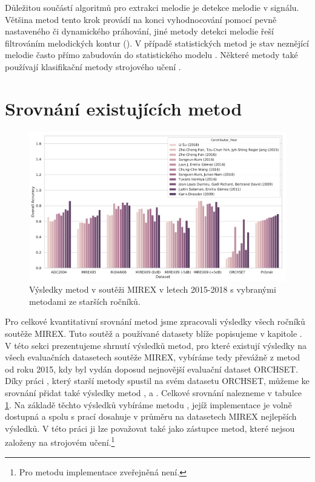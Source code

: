 Důležitou součástí algoritmů pro extrakci melodie je detekce melodie v signálu. Většina metod tento krok provádí na konci vyhodnocování pomocí pevně nastaveného či dynamického práhování, jiné metody detekci melodie řeší filtrováním melodických kontur (\cite{Salamon2012a}). V případě statistických metod je stav neznějící melodie často přímo zabudován do statistického modelu \citep{Ryynanen2008}. Některé metody také používají klasifikační metody strojového učení \citep{Rigaud2016}.

\section{Srovnání existujících metod}

\begin{figure}[h]\centering
\includegraphics[width=\textwidth,height=\textheight,keepaspectratio]{../img/mirex_results}
\caption{Výsledky metod v soutěži MIREX v letech 2015-2018 s vybranými metodami ze starších ročníků.}
\label{obr:mirex_results}
\end{figure}
Pro celkové kvantitativní srovnání metod jsme zpracovali výsledky všech ročníků soutěže MIREX. Tuto soutěž a používané datasety blíže popisujeme v kapitole . V této sekci prezentujeme shrnutí výsledků metod, pro které existují výsledky na všech evaluačních datasetech soutěže MIREX, vybíráme tedy převážně z metod od roku 2015, kdy byl vydán doposud nejnovější evaluační dataset ORCHSET. Díky práci \cite{Bosch2014}, který starší metody spustil na svém datasetu ORCHSET, můžeme ke srovnání přidat také výsledky metod \cite{Dressler2009}, \cite{Salamon2012a} a \cite{Durrieu2010}. Celkové srovnání nalezneme v tabulce \ref{obr:mirex_results}. Na základě těchto výsledků vybíráme metodu \cite{Salamon2012a}, jejíž implementace je volně dostupná a spolu s prací \cite{Dressler2009} dosahuje v průměru na datasetech MIREX nejlepších výsledků. V této práci ji lze považovat také jako zástupce metod, které nejsou založeny na strojovém učení.\footnote{Pro metodu \cite{Dressler2009} implementace zveřejněná není.}

